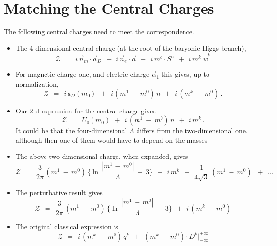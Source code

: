 \documentclass[epsfig,12pt]{article}
\def\beq{\begin{equation}}
\def\eeq{\end{equation}}
\def\beq{\begin{equation}}
\def\eeq{\end{equation}}
\newcommand{\mc}[1]{\mathcal{#1}}
\begin{document}
\section{Matching the Central Charges}
\setcounter{equation}{0}

       The following central charges need to meet the correspondence.
\vspace{0.6cm}

\begin{itemize}
\item
       The 4-dimensional central charge (at the root of the baryonic Higgs branch),
\beq
       \mc{Z}  ~~=~~ i\, \vec{n}{}_m \cdot \vec{a}{}_D  ~~+~~ i\, \vec{n}{}_e \cdot \vec{a}  
               ~~+~~ i\, m^a \cdot S^a ~~+~~ i\, m^k \; \vec{w}^k
\eeq

\item
       For magnetic charge one, and electric charge $ \vec{\alpha}{}_1 $ this gives, up to normalization,
\beq
       \mc{Z}  ~~=~~ i\, a_D(m_0)  ~~+~~ i\, ( m^1 ~-~ m^0 )\, n ~~+~~ i\, ( m^k ~-~ m^0 )\,.
\eeq

\item
       Our 2-d expression for the central charge gives
\beq
       \mc{Z}  ~~=~~ U_0(m_0)      ~~+~~ i\, ( m^1 ~-~ m^0 )\, n ~~+~~ i\, m^k\,. 
\eeq
       It could be that the four-dimensional $ \Lambda $ differs from the two-dimensional one, although
       then one of them would have to depend on the masses.

\item
       The above two-dimensional charge, when expanded, gives
\beq
       \mc{Z} ~~=~~        
       \frac{3}{2\pi}\, (m^1 ~-~ m^0)\, \bigg\{ \ln\, \frac {   | m^1 \,-\, m^0 |   }
                                                            {        \Lambda        } ~-~ 3 \bigg\}
       ~~+~~ i\, m^k 
       ~~-~~ \frac{1}{4\sqrt{3}}\; ( m^1 ~-~ m^0 )\, 
       ~~+~~ ...
\eeq

\item
       The perturbative result gives 
\beq
       \mc{Z} ~~=~~        
       \frac{3}{2\pi}\, (m^1 ~-~ m^0)\, \bigg\{ \ln\, \frac {   | m^1 \,-\, m^0 |   }
                                                            {        \Lambda        } ~-~ 3 \bigg\}
       ~~+~~ i\, ( m^k ~-~ m^0)
\eeq

\item
       The original classical expression is
\beq
       \mc{Z} ~~=~~ i\, (m^k ~-~ m^0)\, q^k  ~~+~~ (m^k ~-~ m^0) \cdot D^k \Big|^{\scriptscriptstyle +\infty}_{\scriptscriptstyle -\infty}
\eeq
\end{itemize}
\end{document}
